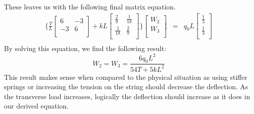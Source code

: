 \documentclass[a4paper]{article}
\begin{document}
These leaves us with the following final matrix equation.
\begin{eqnarray*}
\Big\{ 
\frac{T}{L}
\begin{bmatrix}
 6 & -3\\
 -3 & 6\\
\end{bmatrix} +
kL
\begin{bmatrix}
\frac{2}{9} & \frac{1}{18}\\[3pt]
\frac{1}{18} & \frac{2}{9}\\[3pt]
\end{bmatrix}
\Big\}
\begin{bmatrix}
W_{2} \\
W_{3} \\ 
\end{bmatrix}
& = &
q_{0}L
\begin{bmatrix}
\frac{1}{3} \\[3pt]
\frac{1}{3} \\[3pt]
\end{bmatrix}\\
\end{eqnarray*}
By solving this equation, we find the following result:
$$W_{2} = W_{3} = \frac{6q_{0}L^{2}}{54T+5kL^{2}}$$
This result makes sense when compared to the physical situation as using stiffer springs or increasing the tension on the string should decrease the deflection.  As the transverse load increases, logically the deflection should increase as it does in our derived equation.
\end{document}
